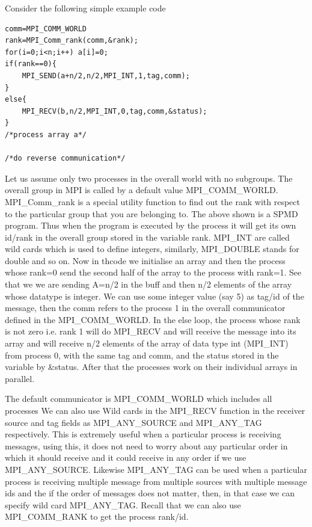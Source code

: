 \documentclass[12pt]{book}
\begin{document}
Consider the following simple example code
\begin{lstlisting}
comm=MPI_COMM_WORLD
rank=MPI_Comm_rank(comm,&rank);
for(i=0;i<n;i++) a[i]=0;
if(rank==0){
    MPI_SEND(a+n/2,n/2,MPI_INT,1,tag,comm);
}
else{
    MPI_RECV(b,n/2,MPI_INT,0,tag,comm,&status);
}
/*process array a*/

/*do reverse communication*/
\end{lstlisting}
Let us assume only two processes in the overall world with no subgroups. The overall group in MPI is called by a default value MPI\_COMM\_WORLD.
MPI\_Comm\_rank is a special utility function to find out the rank with respect to the particular group that you are belonging to. The above shown is a SPMD program. Thus when the program is executed by the process it will get its own id/rank in the overall group stored in the variable rank. MPI\_INT are called wild cards which is used to define integers, similarly, MPI\_DOUBLE stands for double and so on. Now in thcode we initialise an array and then the process whose rank=0 send the second half of the array to the process with rank=1. See that we we are sending A=n/2 in the buff and then n/2 elements of the array whose datatype is integer. We can use some integer value (say 5) as tag/id of the message, then the comm refers to the process 1 in the overall communicator defined in the MPI\_COMM\_WORLD. In the else loop, the process whose rank is not zero i.e. rank 1 will do MPI\_RECV and will receive the message into its array and will receive n/2 elements of the array of data type int (MPI\_INT) from process 0, with the same tag and comm, and the status stored in the variable by \&status. After that the processes work on their individual arrays in parallel.

The default communicator is MPI\_COMM\_WORLD which includes all processes We can also use Wild cards in the MPI\_RECV function in the receiver source and tag fields as MPI\_ANY\_SOURCE and MPI\_ANY\_TAG respectively. This is extremely useful when a particular process is receiving messages, using this, it does not need to worry about any particular order in which it should receive and it could receive in any order if we use MPI\_ANY\_SOURCE. Likewise MPI\_ANY\_TAG can be used when a particular process is receiving multiple message from multiple sources with multiple message ids and the if the order of messages does not matter, then, in that case we can specify wild card MPI\_ANY\_TAG. Recall that we can also use MPI\_COMM\_RANK to get the process rank/id.
\end{document}

